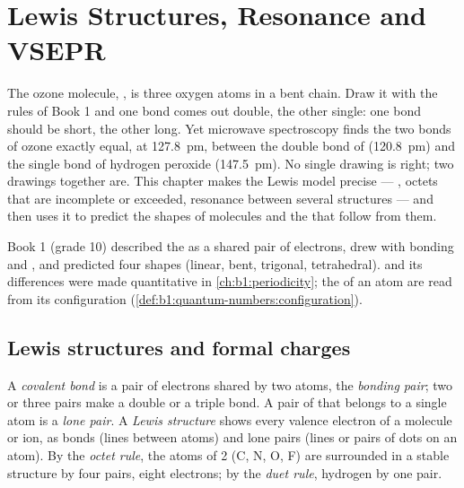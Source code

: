 \chapter{Lewis Structures, Resonance and VSEPR}\label{ch:b1:lewis-resonance-vsepr}

The ozone molecule, , is three oxygen atoms in a bent chain. Draw
it with the rules of Book 1 and one bond comes out double, the other
single: one bond should be short, the other long. Yet microwave
spectroscopy finds the two  bonds of ozone exactly equal, at
\qty{127.8}{pm}, between the double bond of  (\qty{120.8}{pm}) and
the single bond of hydrogen peroxide (\qty{147.5}{pm}). No single drawing
is right; two drawings together are. This chapter makes the Lewis model
precise --- , octets that are incomplete or exceeded,
resonance between several structures --- and then uses it to predict
the shapes of molecules and the  that follow from them.

\begin{recall}
Book 1 (grade 10) described the  as a shared pair of
electrons, drew  with bonding and , and
predicted four shapes (linear, bent, trigonal, tetrahedral).
 and its differences were made quantitative in
\cref{ch:b1:periodicity}; the  of an atom are read from
its configuration (\cref{def:b1:quantum-numbers:configuration}).
\end{recall}

\section{Lewis structures and formal charges}

\begin{definition}\label{def:b1:lewis-resonance-vsepr:lewis}
A \emph{covalent bond} is a pair of electrons shared
by two atoms, the \emph{bonding pair}; two or three
pairs make a double or a triple bond. A pair of  that
belongs to a single atom is a \emph{lone pair}. A
\emph{Lewis structure} shows every valence
electron of a molecule or ion, as bonds (lines between atoms) and lone
pairs (lines or pairs of dots on an atom). By the \emph{octet
rule}, the atoms of  2 (C, N, O, F) are
surrounded in a stable structure by four pairs, eight electrons; by the
\emph{duet rule}, hydrogen by one pair.
\end{definition}

